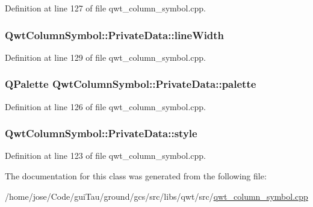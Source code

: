 Definition at line 127 of file qwt\-\_\-column\-\_\-symbol.\-cpp.

\hypertarget{class_qwt_column_symbol_1_1_private_data_a33133406701e80db6c346d35b8b6ee43}{
\subsubsection[{line\-Width}]{ Qwt\-Column\-Symbol\-::\-Private\-Data\-::line\-Width}}\label{class_qwt_column_symbol_1_1_private_data_a33133406701e80db6c346d35b8b6ee43}


Definition at line 129 of file qwt\-\_\-column\-\_\-symbol.\-cpp.

\hypertarget{class_qwt_column_symbol_1_1_private_data_a2a520b3a8dd9e781afaea646f5238285}{
\subsubsection[{palette}]{\setlength{\rightskip}{0pt plus 5cm}Q\-Palette Qwt\-Column\-Symbol\-::\-Private\-Data\-::palette}}\label{class_qwt_column_symbol_1_1_private_data_a2a520b3a8dd9e781afaea646f5238285}


Definition at line 126 of file qwt\-\_\-column\-\_\-symbol.\-cpp.

\hypertarget{class_qwt_column_symbol_1_1_private_data_aa63e78f0321a9d2754b9ef4a6517cd41}{
\subsubsection[{style}]{ Qwt\-Column\-Symbol\-::\-Private\-Data\-::style}}\label{class_qwt_column_symbol_1_1_private_data_aa63e78f0321a9d2754b9ef4a6517cd41}


Definition at line 123 of file qwt\-\_\-column\-\_\-symbol.\-cpp.



The documentation for this class was generated from the following file\-:\begin{DoxyCompactItemize}
\item 
/home/jose/\-Code/gui\-Tau/ground/gcs/src/libs/qwt/src/\hyperlink{qwt__column__symbol_8cpp}{qwt\-\_\-column\-\_\-symbol.\-cpp}\end{DoxyCompactItemize}
